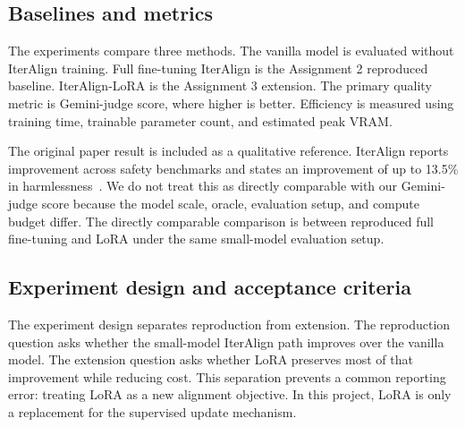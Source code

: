 \documentclass[10pt,twocolumn]{article}
\newcommand{\method}{IterAlign-LoRA}
\begin{document}
\begin{table}[t]
\centering
\caption{Training and evaluation configuration.}
\label{tab:hparams-final}
\end{table}

\subsection{Baselines and metrics}
The experiments compare three methods. The vanilla model is evaluated without IterAlign training. Full fine-tuning IterAlign is the Assignment 2 reproduced baseline. \method{} is the Assignment 3 extension. The primary quality metric is Gemini-judge score, where higher is better. Efficiency is measured using training time, trainable parameter count, and estimated peak VRAM.

The original paper result is included as a qualitative reference. IterAlign reports improvement across safety benchmarks and states an improvement of up to 13.5\% in harmlessness~\cite{chen2024iteralign}. We do not treat this as directly comparable with our Gemini-judge score because the model scale, oracle, evaluation setup, and compute budget differ. The directly comparable comparison is between reproduced full fine-tuning and LoRA under the same small-model evaluation setup.

\subsection{Experiment design and acceptance criteria}
The experiment design separates reproduction from extension. The reproduction question asks whether the small-model IterAlign path improves over the vanilla model. The extension question asks whether LoRA preserves most of that improvement while reducing cost. This separation prevents a common reporting error: treating LoRA as a new alignment objective. In this project, LoRA is only a replacement for the supervised update mechanism.
\end{document}
